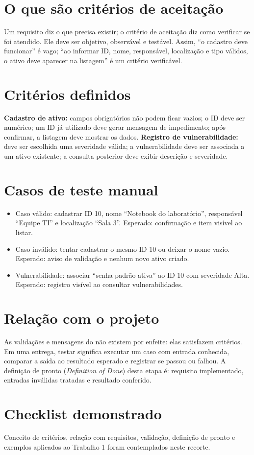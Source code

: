 \documentclass[11pt,a4paper]{article}
\begin{document}
\section*{O que são critérios de aceitação}
Um requisito diz o que precisa existir; o critério de aceitação diz como verificar se foi atendido. Ele deve ser objetivo, observável e testável. Assim, ``o cadastro deve funcionar'' é vago; ``ao informar ID, nome, responsável, localização e tipo válidos, o ativo deve aparecer na listagem'' é um critério verificável.
\section*{Critérios definidos}
\textbf{Cadastro de ativo:} campos obrigatórios não podem ficar vazios; o ID deve ser numérico; um ID já utilizado deve gerar mensagem de impedimento; após confirmar, a listagem deve mostrar os dados. \textbf{Registro de vulnerabilidade:} deve ser escolhida uma severidade válida; a vulnerabilidade deve ser associada a um ativo existente; a consulta posterior deve exibir descrição e severidade.
\section*{Casos de teste manual}
\begin{itemize}
\item Caso válido: cadastrar ID 10, nome ``Notebook do laboratório'', responsável ``Equipe TI'' e localização ``Sala 3''. Esperado: confirmação e item visível ao listar.
\item Caso inválido: tentar cadastrar o mesmo ID 10 ou deixar o nome vazio. Esperado: aviso de validação e nenhum novo ativo criado.
\item Vulnerabilidade: associar ``senha padrão ativa'' ao ID 10 com severidade Alta. Esperado: registro visível ao consultar vulnerabilidades.
\end{itemize}
\section*{Relação com o projeto}
As validações e mensagens do  não existem por enfeite: elas satisfazem critérios. Em uma entrega, testar significa executar um caso com entrada conhecida, comparar a saída ao resultado esperado e registrar se passou ou falhou. A definição de pronto (\textit{Definition of Done}) desta etapa é: requisito implementado, entradas inválidas tratadas e resultado conferido.
\section*{Checklist demonstrado}
Conceito de critérios, relação com requisitos, validação, definição de pronto e exemplos aplicados ao Trabalho 1 foram contemplados neste recorte.
\end{document}
